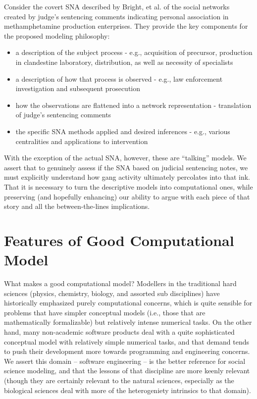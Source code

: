 \documentclass{article}
\begin{document}
Consider the covert SNA described by Bright, et al. of the social networks created by judge's sentencing comments indicating personal association in methamphetamine production enterprises.  They provide the key components for the proposed modeling philosophy:
\begin{itemize}
\item a description of the subject process - e.g., acquisition of precursor, production in clandestine laboratory, distribution, as well as necessity of specialists
\item a description of how that process is observed - e.g., law enforcement investigation and subsequent prosecution
\item how the observations are flattened into a network representation - translation of judge's sentencing comments
\item the specific SNA methods applied and desired inferences - e.g., various centralities and applications to intervention
\end{itemize}

With the exception of the actual SNA, however, these are ``talking'' models.  We assert that to genuinely assess if the SNA based on judicial sentencing notes, we must explicitly understand how gang activity ultimately percolates into that ink.  That it is necessary to turn the descriptive models into computational ones, while preserving (and hopefully enhancing) our ability to argue with each piece of that story and all the between-the-lines implications.

\section*{Features of Good Computational Model}
What makes a good computational model?  Modellers in the traditional hard sciences (physics, chemistry, biology, and assorted sub disciplines) have historically emphasized purely computational concerns, which is quite sensible for problems that have simpler conceptual models (i.e., those that are mathematically formalizable) but relatively intense numerical tasks.  On the other hand, many non-academic software products deal with a quite sophisticated conceptual model with relatively simple numerical tasks, and that demand tends to push their development more towards programming and engineering concerns.  We assert this domain -- software engineering -- is the better reference for social science modeling, and that the lessons of that discipline are more keenly relevant (though they are certainly relevant to the natural sciences, especially as the biological sciences deal with more of the heterogeniety intrinsics to that domain).
\end{document}

